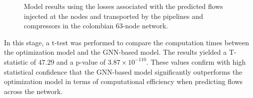 \begin{figure}
    \centering
        \setlength{}        
        \setlength{} 
        \caption{Model results using the losses associated with the predicted flows injected at the nodes and transported by the pipelines and compressors in the colombian 63-node network.}
        \label{fig:col_base_f_results}
\end{figure}


In this stage, a t-test was performed to compare the computation times between the optimization model and the GNN-based model. The results yielded a T-statistic of $47.29$ and a p-value of $3.87 \times 10^{-110}$. These values confirm with high statistical confidence that the GNN-based model significantly outperforms the optimization model in terms of computational efficiency when predicting flows across the network.




